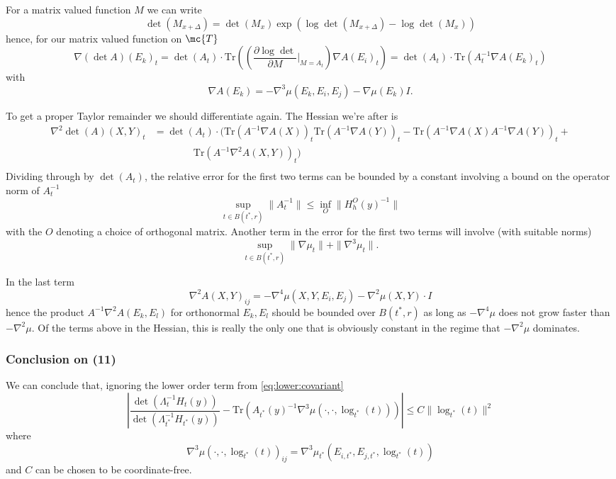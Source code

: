 \documentclass{article}
\begin{document}
For a matrix valued function $M$ we can write
$$
\det(M_{x+\Delta}) = \det(M_{x}) \exp(\log \det(M_{x+\Delta}) - \log \det( M_{x}))
$$
hence, for our matrix valued function on $\mc{T}$
$$
\nabla (\det A)(E_k)_t = \det(A_{t}) \cdot \text{Tr}\left(\left(\frac{\partial \log \det}{\partial M}\biggl|_{M=A_t}\right) \nabla A(E_i)_t\right) = \det(A_t) \cdot
\text{Tr}(A_t^{-1} \nabla A(E_k)_t)
$$
with
$$
\nabla A(E_k) = -\nabla^3 \mu(E_k, E_i, E_j) - \nabla \mu(E_k) I.
$$

 To get a proper Taylor remainder we should differentiate again.
 The Hessian we're after is
 $$
\begin{aligned}
  \nabla^2 \det (A)(X, Y)_t &= \det(A_t) \cdot \biggl(\text{Tr}(A^{-1}\nabla A(X))_t \text{Tr}(A^{-1}\nabla A(Y))_t - \text{Tr}(A^{-1}\nabla A(X)A^{-1}\nabla A(Y))_t + \\
  & \qquad \qquad \text{Tr}(A^{-1}\nabla^2 A(X, Y))_t \biggr) \\
\end{aligned}
 $$
Dividing through by $\det(A_t)$, the relative error
for the first two terms can be bounded by a constant involving a bound on the operator norm of $A^{-1}_t$
$$
\sup_{t \in B(t^*,r)} \|A^{-1}_t\| \leq \inf_O  \|H^O_h(y)^{-1}\|
$$
with the $O$ denoting a choice of orthogonal matrix.
Another term in the error for the first two terms will involve (with suitable norms)
$$
\sup_{t \in B(t^*,r)} \|\nabla \mu_t\| + \|\nabla^3 \mu_t\|.
$$

In the last term
$$
\nabla^2 A(X, Y)_{ij} = -\nabla^4 \mu(X, Y, E_i, E_j) - \nabla^2 \mu(X, Y) \cdot I
$$
hence the product $A^{-1} \nabla^2 A(E_k, E_l)$ for orthonormal $E_k, E_l$ should be bounded over $B(t^*,r)$ as long as
$-\nabla^4 \mu$ does not grow faster than $-\nabla^2 \mu$. Of the terms above in the Hessian, this is really the only one that is obviously constant in the regime that $-\nabla^2\mu$ dominates.

\subsubsection{Conclusion on (11)}

We can conclude that, ignoring the lower order term from \eqref{eq:lower:covariant}
$$
\left|\frac{\det(\Lambda_t^{-1}H_t(y))}{\det(\Lambda_{t^*}^{-1}H_{t^*}(y))} - \text{Tr}(A_{t^*}(y)^{-1} \nabla^3 \mu(\cdot, \cdot, \log_{t^*}(t))) \right| \leq C \| \log_{t^*}(t)\|^2  
 $$
where
$$
\nabla^3 \mu(\cdot, \cdot, \log_{t^*}(t))_{ij} = \nabla^3 \mu_{t^*}(E_{i,t^*}, E_{j,t^*}, \log_{t^*}(t))
$$
and
 $C$ can be chosen to be coordinate-free.
\end{document}
